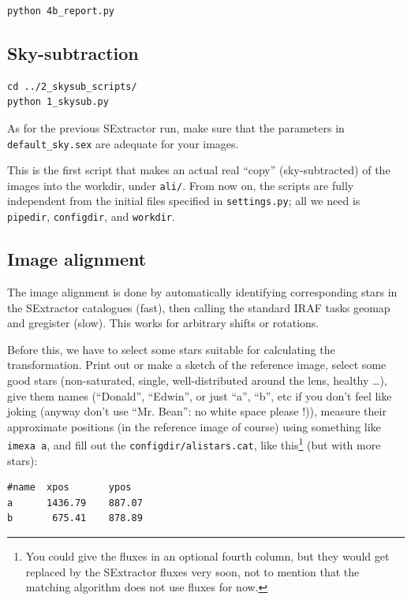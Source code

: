 \begin{Verbatim}
python 4b_report.py 
\end{Verbatim}




\subsection{Sky-subtraction}

\begin{Verbatim}
cd ../2_skysub_scripts/
python 1_skysub.py
\end{Verbatim}

As for the previous SExtractor run, make sure that the parameters in \verb+default_sky.sex+ are adequate for your images.

This is the first script that makes an actual real ``copy'' (sky-subtracted) of the images into the workdir, under \verb+ali/+. From now on, the scripts are fully independent from the initial files specified in \verb+settings.py+; all we need is \verb+pipedir+, \verb+configdir+, and \verb+workdir+.


\subsection{Image alignment}

The image alignment is done by automatically identifying corresponding stars in the SExtractor catalogues (fast), then calling the standard IRAF tasks geomap and gregister (slow). This works for arbitrary shifts or rotations.

Before this, we have to select some stars suitable for calculating the transformation. Print out or make a sketch of the reference image, select some good stars (non-saturated, single, well-distributed around the lens, healthy \ldots), give them names (``Donald'', ``Edwin'', or just ``a'', ``b'', etc if you don't feel like joking (anyway don't use ``Mr. Bean'': no white space please !)), measure their approximate positions (in the reference image of course) using something like \verb+imexa a+, and fill out the \verb+configdir/alistars.cat+, like this\footnote{You could give the fluxes in an optional fourth column, but they would get replaced by the SExtractor fluxes very soon, not to mention that the matching algorithm does not use fluxes for now.} (but with more stars):

\begin{Verbatim}[fontsize=\relsize{-2}]
#name  xpos       ypos
a      1436.79    887.07
b       675.41    878.89
\end{Verbatim}


